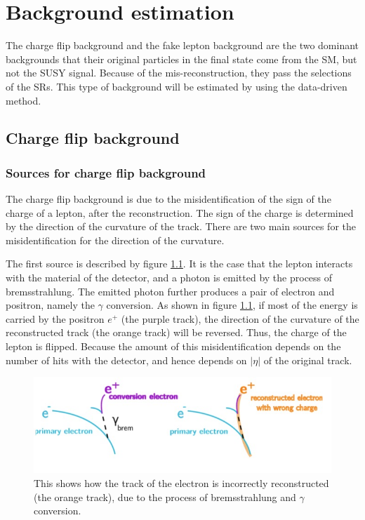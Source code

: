 \chapter{Background estimation}
\label{ch:BG}

The charge flip background and the fake lepton background are the two dominant backgrounds that their original particles in the final state come from the SM, but not the SUSY signal. Because of the mis-reconstruction, they pass the selections of the SRs. This type of background will be estimated by using the data-driven method.

\section{Charge flip background}
\label{sec:charge_flip_background}
\subsection{Sources for charge flip background}
The charge flip background is due to the misidentification of the sign of the charge of a lepton, after the reconstruction.
The sign of the charge is determined by the direction of the curvature of the track.
There are two main sources for the misidentification for the direction of the curvature.

The first source is described by figure \ref{fig:charge_flip_bremsstrahlung}.
It is the case that the lepton interacts with the material of the detector, and a photon is emitted by the process of bremsstrahlung.
The emitted photon further produces a pair of electron and positron, namely the $\gamma$ conversion.
As shown in figure \ref{fig:charge_flip_bremsstrahlung}, if most of the energy is carried by the positron $e^{+}$ (the purple track), the direction of the curvature of the reconstructed track (the orange track) will be reversed.
Thus, the charge of the lepton is flipped.
Because the amount of this misidentification depends on the number of hits with the detector, and hence depends on $|\eta|$ of the original track.

\begin{figure}
\centering
\includegraphics[width=\textwidth]{data/photo/charge_flip/Brem.jpg}
\caption{This shows how the track of the electron is incorrectly reconstructed (the orange track), due to the process of bremsstrahlung and $\gamma$ conversion.}
\label{fig:charge_flip_bremsstrahlung}
\end{figure}

